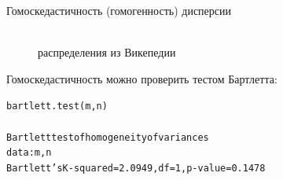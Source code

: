 \begin{frame}{Гомоскедастичность (гомогенность) дисперсии}
\begin{figure}
  \centering
  \qquad
  \\
распределения из Викепедии
\end{figure}
Гомоскедастичность можно проверить тестом Бартлетта:
\scriptsize
\begin{alltt}
\alert{bartlett.test(m, n)\medskip\\}
Bartlett test of homogeneity of variances\\
data:  m, n\\
\alert{Bartlett's K-squared = 2.0949, df = 1, p-value = 0.1478}
\end{alltt}
\normalsize
\end{frame}
